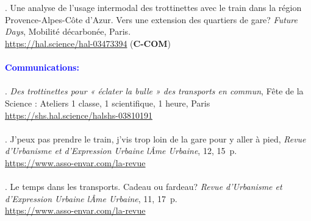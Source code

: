 \begin{refsegment}
\begin{tcolorbox}[colback=white!5!white,
                      colframe=blue!75!blue,
                      title=Valorization
                      \\
                      Chapter~5]
    \\\\
\small{\textcolor{blue}{\textcite{moinse_analyse_2021}}. Une analyse de l’usage intermodal des trottinettes avec le train dans la région Provence-Alpes-Côte d’Azur. Vers une extension des quartiers de gare? \textsl{Future Days}, Mobilité décarbonée, Paris.
\\
\footnotesize{\url{https://hal.science/hal-03473394}} (\textbf{C-COM})}
    \\\\
\Large{\textcolor{blue}{\textbf{Communications:}}}
    \\\\
\small{\textcolor{blue}{\textcite{moinse_trottinettes_2022}}. \textsl{Des trottinettes pour « éclater la bulle » des transports en commun}, Fête de la Science : Ateliers 1 classe, 1 scientifique, 1 heure, Paris 
\\
\footnotesize{\url{https://shs.hal.science/halshs-03810191}}}
    \\\\
\small{\textcolor{blue}{\textcite{moinse_jpeux_2022}}. J’peux pas prendre le train, j’vis trop loin de la gare pour y aller à pied, \textsl{Revue d'Urbanisme et d'Expression Urbaine lÂme Urbaine}, 12, 15~p.
\\
\footnotesize{\url{https://www.asso-envar.com/la-revue}}}
    \\\\
\small{\textcolor{blue}{\textcite{moinse_temps_2020}}. Le temps dans les transports. Cadeau ou fardeau? \textsl{Revue d'Urbanisme et d'Expression Urbaine lÂme Urbaine}, 11, 17~p.
\\
\footnotesize{\url{https://www.asso-envar.com/la-revue}}}
    \end{tcolorbox}

    \newpage
    \begingroup
    \renewcommand{\bibfont}{\scriptsize}
\printbibliography[segment=\therefsegment, heading=subbibintoc, title={Bibliography of Chapter~5}, label=chap5:bibliographie]
    \endgroup
    \end{refsegment}